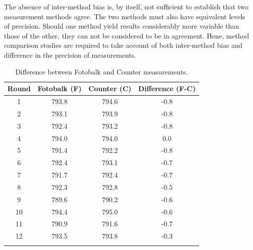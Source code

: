 \documentclass[12pt, a4paper]{report}
\theoremstyle{plain}
\theoremstyle{definition}
\theoremstyle{remark}
\begin{document}
	The absence of inter-method bias is, by itself, not sufficient to
	establish that two measurement methods agree. The two methods
	must also have equivalent levels of precision. Should one method
	yield results considerably more variable than those of the other,
	they can not be considered to be in agreement. 
	Hene, method comparison studies are required to take account of both inter-method bias and difference in the precision of measurements.
	\begin{table}[h!]
		
		\begin{center}
			\phantom{MAKESPACE}
			\begin{tabular}{cccc}
				\hline
				Round & Fotobalk (F) & Counter (C) & Difference (F-C) \\
				\hline
				1 & 793.8& 794.6 & -0.8 \\
				2 & 793.1 & 793.9 & -0.8 \\
				3 & 792.4 & 793.2 & -0.8 \\
				4 & 794.0 & 794.0 & 0.0 \\
				5 & 791.4 & 792.2 & -0.8 \\
				6 & 792.4 & 793.1 & -0.7 \\
				7 & 791.7 & 792.4 & -0.7 \\
				8 & 792.3 & 792.8 & -0.5 \\
				9 & 789.6 & 790.2 & -0.6 \\
				10 & 794.4 & 795.0 & -0.6 \\
				11 & 790.9 & 791.6 & -0.7 \\
				12 & 793.5 & 793.8 & -0.3 \\
				\phantom{MAKESPACE} & \phantom{MAKESPACE} &\phantom{MAKESPACE} & \phantom{MAKESP}\\
			\end{tabular}
			\caption{Difference between Fotobalk and Counter measurements.}
		\end{center}
	\end{table}
	
	
	
	
	
	
	
	
\end{document}
